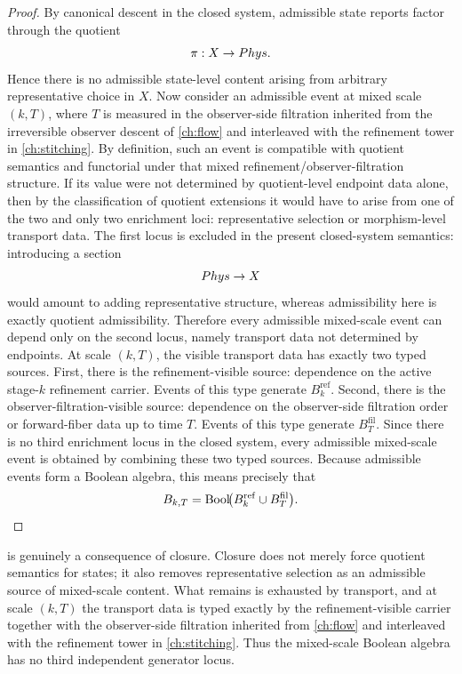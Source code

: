 \begin{proof}
	By canonical descent in the closed system, admissible state reports factor
	through the quotient
	\[
		\pi:X\to Phys.
	\]
	Hence there is no admissible state-level content arising from arbitrary
	representative choice in \(X\).
	Now consider an admissible event at mixed scale \((k,T)\), where \(T\)
	is measured in the observer-side filtration inherited from the
	irreversible observer descent of \cref{ch:flow} and interleaved with
	the refinement tower in \cref{ch:stitching}.  By definition, such an
	event is compatible with quotient semantics and functorial under that
	mixed refinement/observer-filtration structure.  If its value were
	not determined by quotient-level endpoint data alone, then by the
	classification of quotient extensions it would have to arise from one of
	the two and only two enrichment loci: representative selection or
	morphism-level transport data.
	The first locus is excluded in the present closed-system semantics:
	introducing a section
	\[
		Phys\to X
	\]
	would amount to adding representative structure, whereas admissibility
	here is exactly quotient admissibility.
	Therefore every admissible mixed-scale event can depend only on the
	second locus, namely transport data not determined by endpoints.
	At scale \((k,T)\), the visible transport data has exactly two typed
	sources.
	First, there is the refinement-visible source: dependence on the active
	stage-\(k\) refinement carrier.  Events of this type generate
	\(B_k^{\mathrm{ref}}\).
	Second, there is the observer-filtration-visible source: dependence on
	the observer-side filtration order or forward-fiber data up to time
	\(T\).  Events of this type generate \(B_T^{\mathrm{fil}}\).
	Since there is no third enrichment locus in the closed system, every
	admissible mixed-scale event is obtained by combining these two typed
	sources.  Because admissible events form a Boolean algebra, this means
	precisely that
	\[
		B_{k,T}=\operatorname{Bool}\!\bigl(B_k^{\mathrm{ref}}\cup B_T^{\mathrm{fil}}\bigr).
	\]
\end{proof}
\begin{remark}
	 is genuinely a consequence of closure.  Closure
	does not merely force quotient semantics for states; it also removes
	representative selection as an admissible source of mixed-scale content.
	What remains is exhausted by transport, and at scale \((k,T)\) the
	transport data is typed exactly by the refinement-visible carrier
	together with the observer-side filtration inherited from
	\cref{ch:flow} and interleaved with the refinement tower in
	\cref{ch:stitching}.  Thus the mixed-scale Boolean algebra has no
	third independent generator locus.
\end{remark}
